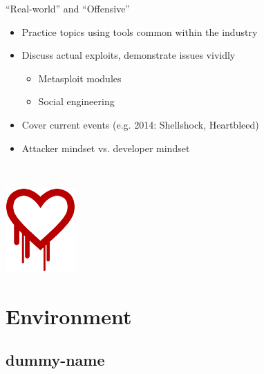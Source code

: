 \documentclass{beamer}
\begin{document}
	\begin{frame}{``Real-world'' and ``Offensive''}
		\begin{itemize}
			\item Practice topics using tools common within the industry			
			\item Discuss actual exploits, demonstrate issues vividly
			\begin{itemize}
				\item Metasploit modules
				\item Social engineering
			\end{itemize}
			\item Cover current events (e.g. 2014: Shellshock, Heartbleed)
			\item Attacker mindset vs. developer mindset
		\end{itemize}		
		~
		\begin{center}
			\includegraphics[width=0.2\textwidth]{heartbleed.png}
		\end{center}
	\end{frame}

	\section{Environment}	
	\subsection{dummy-name}
	
\end{document}
